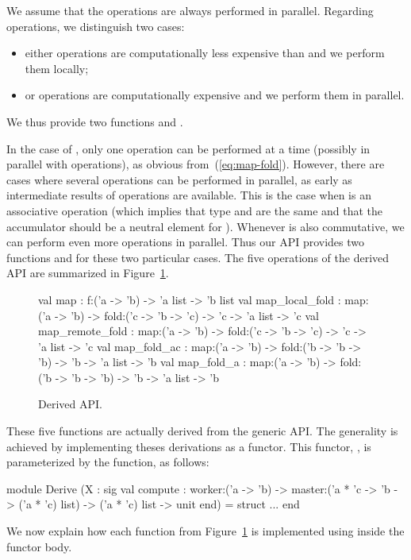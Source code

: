\documentclass[preprint]{sigplanconf}
\begin{document}
We assume that the  operations are always performed in parallel.
Regarding  operations, we distinguish two cases:
\begin{itemize}
\item either  operations are computationally less expensive
  than  and we perform them locally;
\item or  operations are computationally expensive and we
  perform them in parallel.
\end{itemize}
We thus provide two functions  and .

In the case of , only one  operation can
be performed at a time (possibly in parallel with 
operations), as obvious from~(\ref{eq:map-fold}). However, there are
cases where several  operations can be performed in parallel,
as early as intermediate results of  operations are available.
This is the case when  is an associative operation (which
implies that type  and  are the same  and that the
accumulator should be a neutral element for ). Whenever
 is also commutative, we can perform even more 
operations in parallel. Thus our API provides two functions
 and  for these two particular cases.
The five operations of the derived API are summarized
in Figure~\ref{fig:derived}.
\begin{figure}[t]
  \begin{ocaml}
    val map : 
      f:('a -> 'b) -> 'a list -> 'b list 
    val map_local_fold : 
      map:('a -> 'b) -> fold:('c -> 'b -> 'c) -> 
      'c -> 'a list -> 'c 
    val map_remote_fold : 
      map:('a -> 'b) -> fold:('c -> 'b -> 'c) -> 
      'c -> 'a list -> 'c 
    val map_fold_ac : 
      map:('a -> 'b) -> fold:('b -> 'b -> 'b) -> 
      'b -> 'a list -> 'b 
    val map_fold_a : 
      map:('a -> 'b) -> fold:('b -> 'b -> 'b) -> 
      'b -> 'a list -> 'b
  \end{ocaml}
  \caption{Derived API.}
\label{fig:derived}
\end{figure}

These five functions are actually derived from the generic API.
The generality is achieved by implementing theses derivations as a functor.
This functor, , is parameterized by the 
function, as follows:
\begin{ocaml}
module Derive
  (X : sig
     val compute : 
       worker:('a -> 'b) -> 
       master:('a * 'c -> 'b -> ('a * 'c) list) ->
       ('a * 'c) list -> unit
   end) = struct ... end
\end{ocaml}
We now explain how each function from Figure~\ref{fig:derived} is
implemented using  inside the functor body.
\end{document}
